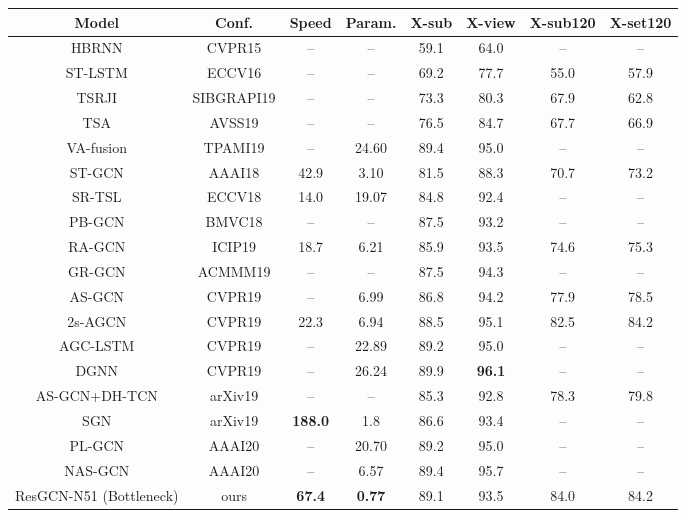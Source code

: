 \documentclass[sigconf]{acmart}
\begin{document}
\begin{table*}
  \begin{center}
  \begin{tabular}{cc|cc|cc|cc}
  \hline
  Model & Conf. & Speed & Param. & X-sub & X-view & X-sub120 & X-set120 \\
  \hline
  \hline
  HBRNN \cite{du2015hierarchical} & CVPR15 & -- & -- & 59.1 & 64.0 & -- & -- \\
  ST-LSTM \cite{liu2016spatio} & ECCV16 & -- & -- & 69.2 & 77.7 & 55.0 & 57.9 \\
  TSRJI \cite{caetano2019skeleton} & SIBGRAPI19 & -- & -- & 73.3 & 80.3 & 67.9 & 62.8 \\
  TSA \cite{caetano2019skelemotion} & AVSS19 & -- & -- & 76.5 & 84.7 & 67.7 & 66.9 \\
  VA-fusion \cite{zhang2019view} & TPAMI19 & -- & 24.60 & 89.4 & 95.0 & -- & -- \\
  \hline
  \hline
  ST-GCN \cite{yan2018spatial} & AAAI18 & 42.9 & 3.10 & 81.5 & 88.3 & 70.7 & 73.2 \\
  SR-TSL \cite{si2018skeleton} & ECCV18 & 14.0 & 19.07 & 84.8 & 92.4 & -- & -- \\
  PB-GCN \cite{thakkar2018part} & BMVC18 & -- & -- & 87.5 & 93.2 & -- & -- \\
  RA-GCN \cite{song2019richly} & ICIP19 & 18.7 & 6.21 & 85.9 & 93.5 & 74.6 & 75.3 \\
  GR-GCN \cite{gao2019optimized} & ACMMM19 & -- & -- & 87.5 & 94.3 & -- & -- \\
  AS-GCN \cite{li2019actional} & CVPR19 & -- & 6.99 & 86.8 & 94.2 & 77.9 & 78.5 \\
  2s-AGCN \cite{shi2019two} & CVPR19 & 22.3 & 6.94 & 88.5 & 95.1 & 82.5 & 84.2 \\
  AGC-LSTM \cite{si2019attention} & CVPR19 & -- & 22.89 & 89.2 & 95.0 & -- & -- \\
  DGNN \cite{shi2019skeleton} & CVPR19 & -- & 26.24 & 89.9 & {\bf 96.1} & -- & -- \\
  AS-GCN+DH-TCN \cite{papadopoulos2019vertex} & arXiv19 & -- & -- & 85.3 & 92.8 & 78.3 & 79.8 \\
  SGN \cite{zhang2019semantics} & arXiv19 & {\bf 188.0} & 1.8 & 86.6 & 93.4 & -- & -- \\
  PL-GCN \cite{huang2020part} & AAAI20 & -- & 20.70 & 89.2 & 95.0 & -- & -- \\
  NAS-GCN \cite{peng2020learning} & AAAI20 & -- & 6.57 & 89.4 & 95.7 & -- & -- \\
  \hline
  \hline
  ResGCN-N51 (Bottleneck) & ours & {\bf 67.4} & {\bf 0.77} & 89.1 & 93.5 & 84.0 & 84.2 \\

\end{tabular}
\end{center}
\end{table*}
\end{document}
